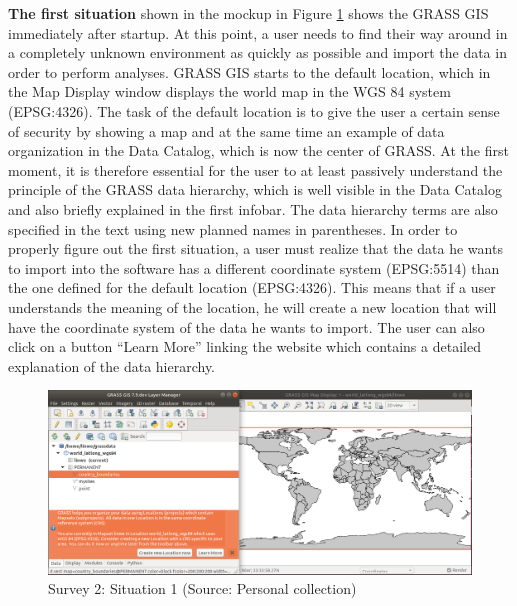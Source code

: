 \documentclass[a4paper,10pt,twoside]{article}
\begin{document}
\textbf{The first situation} shown in the mockup in Figure
\ref{fig:grass_infobar_1} shows the GRASS GIS immediately after
startup. At this point, a user needs to find their way around in a
completely unknown environment as quickly as possible and import the
data in order to perform analyses.
GRASS GIS starts to the default location, which in the
Map Display window displays the world map in the WGS 84 system
(EPSG:4326). The task of the default location is to give the user a
certain sense of security by showing a map and at the same time an
example of data organization in the Data Catalog, which is now the
center of GRASS. At the first moment, it is therefore essential for
the user to at least passively understand the principle of the GRASS
data hierarchy, which is well visible in the Data Catalog and also
briefly explained in the first infobar. The data hierarchy terms are also 
specified in
the text using new planned names in parentheses. In order to properly
figure out the first situation, a user must realize that the data he
wants to import into the software has a different coordinate system
(EPSG:5514) than the one defined for the default location
(EPSG:4326). This means that if a user understands the meaning of the
location, he will create a new location that will have the coordinate
system of the data he wants to import. The user can also click on a
button ``Learn More'' linking the website \cite{hierarchy} which
contains a detailed explanation of the data hierarchy.

\vspace{0.3cm}
\begin{figure}[hbt!] 
\begin{center}
\includegraphics[width=17cm]{../pictures/grass_infobar_1.png} 
\caption[Survey 2: Situation 1]{Survey 2: Situation 1 (Source: Personal collection)}
\label{fig:grass_infobar_1}
\end{center}
\end{figure}
\end{document}
